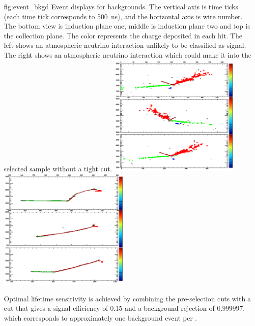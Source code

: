 \begin{dunefigure}
{fig:event_bkgd}
{Event displays for \ptoknubar backgrounds.  The vertical axis is time ticks (each time tick corresponds to \SI{500}{\ns}), and the horizontal axis is wire number. The bottom view is induction plane one, middle is induction plane two and top is the collection plane. The color represents the charge deposited in each hit. The left shows an atmospheric neutrino interaction unlikely to be classified as signal. The right shows an atmospheric neutrino interaction which could make it into the selected sample without a tight cut.}
\includegraphics[width=0.48\textwidth]{graphics/event_bkgd_1.png}
\includegraphics[width=0.48\textwidth]{graphics/event_bkgd_2.png}
\end{dunefigure}

Optimal lifetime sensitivity is achieved by combining the pre-selection cuts with a  cut that gives a signal efficiency of \num{0.15} and a background rejection of 
$0.999997$,
which corresponds to approximately one background event per \si{\Mtyr}. 

